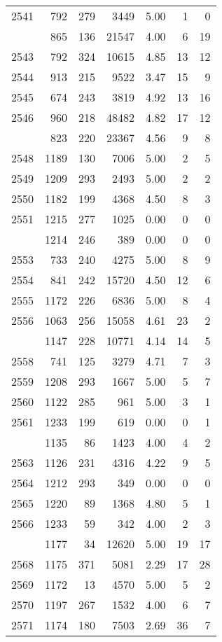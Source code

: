 \documentclass[
]{article}
\begin{document}
\begin{table}
\begin{tabular}[t]{lrrrrrr}
2541 & 792 & 279 & 3449 & 5.00 & 1 & 0\\
\addlinespace
2542 & 865 & 136 & 21547 & 4.00 & 6 & 19\\
2543 & 792 & 324 & 10615 & 4.85 & 13 & 12\\
2544 & 913 & 215 & 9522 & 3.47 & 15 & 9\\
2545 & 674 & 243 & 3819 & 4.92 & 13 & 16\\
2546 & 960 & 218 & 48482 & 4.82 & 17 & 12\\
\addlinespace
2547 & 823 & 220 & 23367 & 4.56 & 9 & 8\\
2548 & 1189 & 130 & 7006 & 5.00 & 2 & 5\\
2549 & 1209 & 293 & 2493 & 5.00 & 2 & 2\\
2550 & 1182 & 199 & 4368 & 4.50 & 8 & 3\\
2551 & 1215 & 277 & 1025 & 0.00 & 0 & 0\\
\addlinespace
2552 & 1214 & 246 & 389 & 0.00 & 0 & 0\\
2553 & 733 & 240 & 4275 & 5.00 & 8 & 9\\
2554 & 841 & 242 & 15720 & 4.50 & 12 & 6\\
2555 & 1172 & 226 & 6836 & 5.00 & 8 & 4\\
2556 & 1063 & 256 & 15058 & 4.61 & 23 & 2\\
\addlinespace
2557 & 1147 & 228 & 10771 & 4.14 & 14 & 5\\
2558 & 741 & 125 & 3279 & 4.71 & 7 & 3\\
2559 & 1208 & 293 & 1667 & 5.00 & 5 & 7\\
2560 & 1122 & 285 & 961 & 5.00 & 3 & 1\\
2561 & 1233 & 199 & 619 & 0.00 & 0 & 1\\
\addlinespace
2562 & 1135 & 86 & 1423 & 4.00 & 4 & 2\\
2563 & 1126 & 231 & 4316 & 4.22 & 9 & 5\\
2564 & 1212 & 293 & 349 & 0.00 & 0 & 0\\
2565 & 1220 & 89 & 1368 & 4.80 & 5 & 1\\
2566 & 1233 & 59 & 342 & 4.00 & 2 & 3\\
\addlinespace
2567 & 1177 & 34 & 12620 & 5.00 & 19 & 17\\
2568 & 1175 & 371 & 5081 & 2.29 & 17 & 28\\
2569 & 1172 & 13 & 4570 & 5.00 & 5 & 2\\
2570 & 1197 & 267 & 1532 & 4.00 & 6 & 7\\
2571 & 1174 & 180 & 7503 & 2.69 & 36 & 7\\

\end{tabular}
\end{table}
\end{document}
